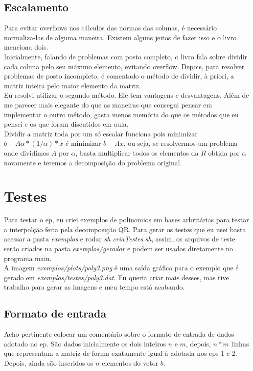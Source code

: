 \documentclass[
10pt, %
a4paper, %
oneside, %
headinclude,footinclude, %
BCOR5mm, %
]{scrartcl}
\begin{document}
\subsection{Escalamento}
Para evitar overflows nos cálculos das normas das colunas, é necessário normaliza-las de alguma maneira. Existem alguns jeitos de fazer isso e o livro menciona dois. \\
Inicialmente, falando de problemas com posto completo, o livro fala sobre dividir cada coluna pelo seu máximo elemento, evitando overflow. Depois, para resolver problemas de posto incompleto, é comentado o método de dividir, à priori, a matriz inteira pelo maior elemento da matriz. \\
Eu resolvi utilizar o segundo método. Ele tem vantagens e desvantagens. Além de me parecer mais elegante do que as maneiras que consegui pensar em implementar o outro método, gasta menos memória do que os métodos que eu pensei e os que foram discutidos em aula. \\
Dividir a matriz toda por um só escalar funciona pois minimizar $b-A\alpha * (1/\alpha) * x$ é minimizar $b-Ax$, ou seja, se resolvermos um problema onde dividimos $A$ por $\alpha$, basta multiplicar todos os elementos da $R$ obtida por $\alpha$ novamente e teremos a decomposição do problema original.

\section{Testes}
Para testar o ep, eu criei exemplos de polinomios em bases arbritárias para testar a interpolção feita pela decomposição QR. Para gerar os testes que eu usei basta acessar a pasta \textit{exemplos} e rodar \textit{sh criaTestes.sh}, assim, os arquivos de teste serão criados na pasta \textit{exemplos/gerador} e podem ser usados diretamente no programa main. \\
A imagem \textit{exemplos/plots/poly3.png} é uma saída gráfica para o exemplo que é gerado em \textit{exemplos/testes/poly3.dat}. Eu queria criar mais desses, mas tive trabalho para gerar as imagens e meu tempo está acabando.

\subsection{Formato de entrada}
Acho pertinente colocar um comentário sobre o formato de entrada de dados adotado no ep. São dados inicialmente os dois inteiros $n$ e $m$, depois, $n*m$ linhas que representam a matriz de forma exatamente igual à adotada nos eps 1 e 2. Depois, ainda são inseridos os $n$ elementos do vetor $b$. \\

\end{document}
